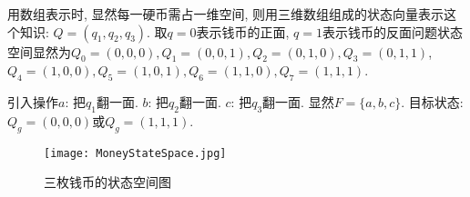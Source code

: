 \begin{answer}
用数组表示时, 显然每一硬币需占一维空间, 则用三维数组组成的状态向量表示这个知识: $Q=(q_1,q_2,q_3)$.
取$q=0$表示钱币的正面, $q=1$表示钱币的反面问题状态空间显然为$Q_0 =(0,0,0), Q_1=(0,0,1), Q_2=(0,1,0), Q_3=(0,1,1)$,
$Q_4=(1,0,0), Q_5=(1,0,1), Q_6=(1,1,0), Q_7=(1,1,1)$.

引入操作$a$: 把$q_1$翻一面. $b$: 把$q_2$翻一面. $c$: 把$q_3$翻一面. 显然$F=\{a,b,c\}$.
目标状态: $Q_g=(0,0,0)$或$Q_g=(1,1,1)$.
\end{answer}
\begin{figure}[!htp]
\centering
\texttt{[image: MoneyStateSpace.jpg]}
\caption{三枚钱币的状态空间图}
\label{MoneyStateSpacefig02}
\end{figure}

